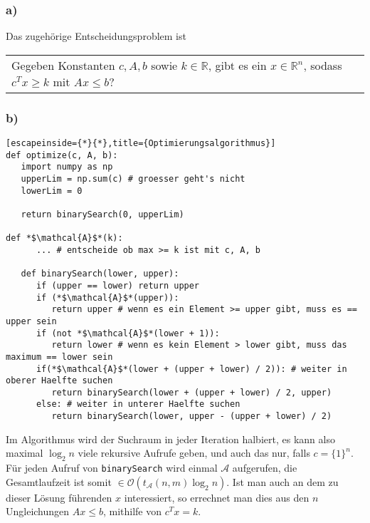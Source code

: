 \documentclass{article}
\begin{document}
\subsubsection{a)}

Das zugehörige Entscheidungsproblem ist

\begin{center}
   \begin{tabular}{p{}}
      Gegeben Konstanten $c, A, b$ sowie $k \in \mathbb{R}$, gibt es ein $x\in\mathbb{R}^n$, sodass $c^Tx \ge k$ mit $Ax \le b$?
   \end{tabular}
\end{center}

\subsubsection{b)}

\begin{lstlisting}[escapeinside={*}{*},title={Optimierungsalgorithmus}]
def optimize(c, A, b):
   import numpy as np
   upperLim = np.sum(c) # groesser geht's nicht
   lowerLim = 0

   return binarySearch(0, upperLim)

def *$\mathcal{A}$*(k):
      ... # entscheide ob max >= k ist mit c, A, b

   def binarySearch(lower, upper):
      if (upper == lower) return upper
      if (*$\mathcal{A}$*(upper)):
         return upper # wenn es ein Element >= upper gibt, muss es == upper sein
      if (not *$\mathcal{A}$*(lower + 1)):
         return lower # wenn es kein Element > lower gibt, muss das maximum == lower sein
      if(*$\mathcal{A}$*(lower + (upper + lower) / 2)): # weiter in oberer Haelfte suchen
         return binarySearch(lower + (upper + lower) / 2, upper)
      else: # weiter in unterer Haelfte suchen
         return binarySearch(lower, upper - (upper + lower) / 2)
\end{lstlisting}

Im Algorithmus wird der Suchraum in jeder Iteration halbiert, es kann also
maximal $\log_2{n}$ viele rekursive Aufrufe geben, und auch das nur, falls $c =
\{1\}^n$. Für jeden Aufruf von \texttt{binarySearch} wird einmal $\mathcal{A}$
aufgerufen, die Gesamtlaufzeit ist somit
$\in\mathcal{O}\left(t_{\mathcal{A}}(n,m)\log_2{n}\right)$. Ist man auch an dem
zu dieser Lösung führenden $x$ interessiert, so errechnet man dies aus den $n$
Ungleichungen $Ax \le b$, mithilfe von $c^Tx = k$.
\end{document}
